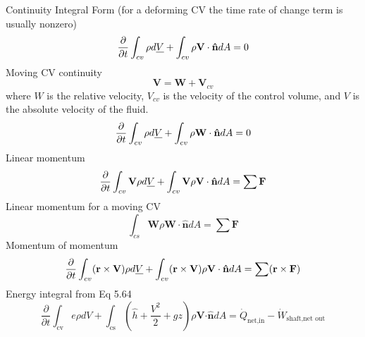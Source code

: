 \documentclass{article}
\begin{document}
Continuity Integral Form (for a deforming CV the time rate of change term is usually nonzero)
\begin{equation}
    \frac{\partial}{\partial t}\int_{cv}\rho d\sout{V} + \int_{cv}\rho \mathbf{V}\cdot \mathbf{\hat{n}} dA = 0
\end{equation}
\newline
\newline
Moving CV continuity
\begin{equation}
    \mathbf{V} = \mathbf{W} + \mathbf{V}_{cv}
\end{equation}
\noindent where $W$ is the relative velocity, $V_{cv}$ is the velocity of the control volume, and $V$ is the absolute velocity of the fluid.
\begin{equation}
     \frac{\partial}{\partial t}\int_{cv}\rho d\sout{V} + \int_{cv}\rho \mathbf{W}\cdot \mathbf{\hat{n}} dA = 0
\end{equation}
\newline
\newline
Linear momentum 
\begin{equation}
    \frac{\partial}{\partial t}\int_{cv}\mathbf{V}\rho d\sout{V} + \int_{cv}\mathbf{V}\rho \mathbf{V}\cdot \mathbf{\hat{n}} dA = \sum\mathbf{F}
\end{equation}
\newline
\newline
Linear momentum for a moving CV
\begin{equation}
    \int_{cs}\mathbf{W}\rho\mathbf{W}\cdot \mathbf{\hat{n}} dA = \sum\mathbf{F}
\end{equation}
\newline
\newline
Momentum of momentum 
\begin{equation}
    \frac{\partial}{\partial t}\int_{cv}(\mathbf{r}\times\mathbf{V})\rho d\sout{V} + \int_{cv}(\mathbf{r}\times\mathbf{V})\rho \mathbf{V}\cdot \mathbf{\hat{n}} dA = \sum(\mathbf{r}\times\mathbf{F})
\end{equation}
\newline
\newline
Energy integral from Eq 5.64
\begin{equation}
  \frac{\partial}{\partial t} \int_\text{cv} e \rho d V + \int_\text{cs} \left(\hat{h} + \frac{V^2}{2} + g z\right) \rho \mathbf{V} \mathbf{\cdot} \mathbf{\hat{n}} d A = \dot{Q}_\text{net,in} - \dot{W}_\text{shaft,net out}
\end{equation}
\end{document}
